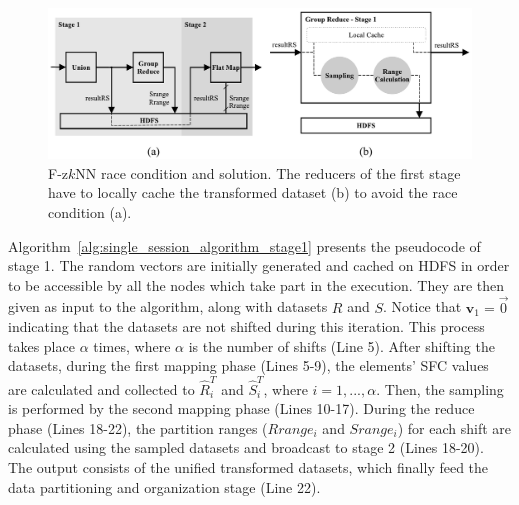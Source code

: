 \begin{figure}[h!]
	\centering
	\includegraphics[width=\textwidth]{figures/figure5.pdf}
	\caption{F-z$k$NN race condition and solution. The reducers of the first stage have to locally cache the transformed dataset (b) to avoid the race condition (a).}
	\label{figure5}
\end{figure}

Algorithm~\ref{alg:single_session_algorithm_stage1} presents the pseudocode of stage 1. The random vectors are initially generated and cached on HDFS in order to be accessible by all the nodes which take part in the execution. They are then given as input to the algorithm, along with datasets $R$ and $S$. Notice that $\textbf{v}_1=\overrightarrow{0}$ indicating that the datasets are not shifted during this iteration. This process takes place $\alpha$ times, where $\alpha$  is the number of shifts (Line 5). After shifting the datasets, during the first mapping phase (Lines 5-9), the elements' SFC values are calculated and collected to $\hat{R}^T_i$ and $\hat{S}^T_i$, where $i=1,...,\alpha$. Then, the sampling is performed by the second mapping phase (Lines 10-17). During the reduce phase (Lines 18-22), the partition ranges ($Rrange_i$ and $Srange_i$) for each shift are calculated using the sampled datasets and broadcast to stage 2 (Lines 18-20). The output consists of the unified transformed datasets, which finally feed the data partitioning and organization stage (Line 22).

